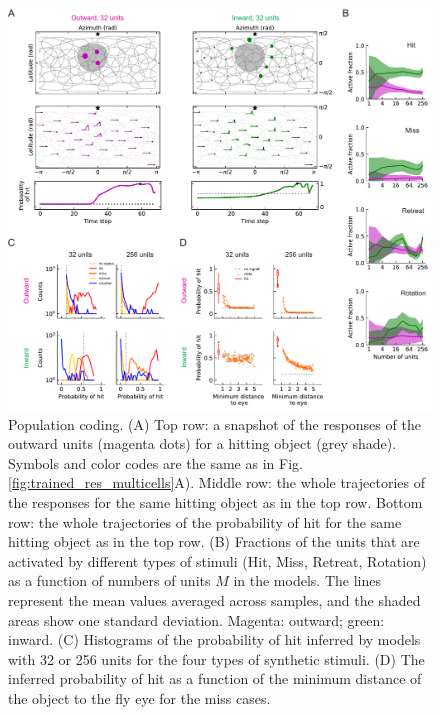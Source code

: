 \documentclass[pdftex,9pt,lineno]{elife}
\begin{document}
\begin{figure}
\begin{fullwidth}
\includegraphics[width=\linewidth]{figures/compare_outward_inward_multiple_units_paper.pdf}
\caption{Population coding. (A) Top row: a snapshot of the responses of the outward units (magenta dots) for a hitting object (grey shade). Symbols and color codes are the same as in Fig. \ref{fig:trained_res_multicells}A). Middle row: the whole trajectories of the responses for the same hitting object as in the top row. Bottom row: the whole trajectories of the probability of hit for the same hitting object as in the top row. (B) Fractions of the units that are activated by different types of stimuli (Hit, Miss, Retreat, Rotation) as a function of numbers of units $M$ in the models. The lines represent the mean values averaged across samples, and the shaded areas show one standard deviation. Magenta: outward; green: inward. (C) Histograms of the probability of hit inferred by models with 32 or 256 units for the four types of synthetic stimuli. (D) The inferred probability of hit as a function of the minimum distance of the object to the fly eye for the miss cases.}
\label{fig:compare_multi}

\end{fullwidth}
\end{figure}
\end{document}
